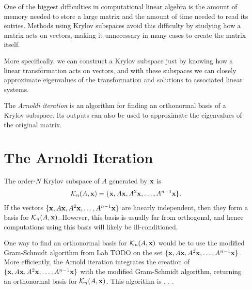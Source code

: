 \label{lab:kry_arnoldi}


One of the biggest difficulties in computational linear algebra is the amount of memory needed to store a large matrix and the amount of time needed to read its entries.
Methods using Krylov subspaces avoid this difficulty by studying how a matrix acts on vectors, making it unnecessary in many cases to create the matrix itself.

More specifically, we can construct a Krylov subspace just by knowing how a linear transformation acts on vectors, and with these subspaces we can closely approximate eigenvalues of the transformation and solutions to associated linear systems.

The \emph{Arnoldi iteration} is an algorithm for finding an orthonormal basis of a Krylov subspace. 
Its outputs can also be used to approximate the eigenvalues of the original matrix.

\section*{The Arnoldi Iteration}
The order-$N$ Krylov subspace of $A$ generated by ${\bf x}$ is 
\[
\mathcal{K}_n(A, {\bf x}) = \{{\bf x}, A{\bf x}, A^2{\bf x}, \ldots, A^{n-1}{\bf x}\}.
\]
If the vectors $\{{\bf x}, A{\bf x}, A^2{\bf x}, \ldots, A^{n-1}{\bf x}\}$ are linearly independent, then they form a basis for $\mathcal{K}_n(A,{\bf x})$. 
However, this basis is usually far from orthogonal, and hence computations using this basis will likely be ill-conditioned.

One way to find an orthonormal basis for $\mathcal{K}_n(A,{\bf x})$ would be to use the modified Gram-Schmidt algorithm from Lab TODO on the set $\{{\bf x}, A{\bf x}, A^2{\bf x}, \ldots, A^{n-1}{\bf x}\}$.
More efficiently, the Arnold iteration integrates the creation of $\{{\bf x}, A{\bf x}, A^2{\bf x}, \ldots, A^{n-1}{\bf x}\}$ with the modified Gram-Schmidt algorithm, returning an orthonormal basis for $\mathcal{K}_n(A,{\bf x})$. This algorithm is . . .





